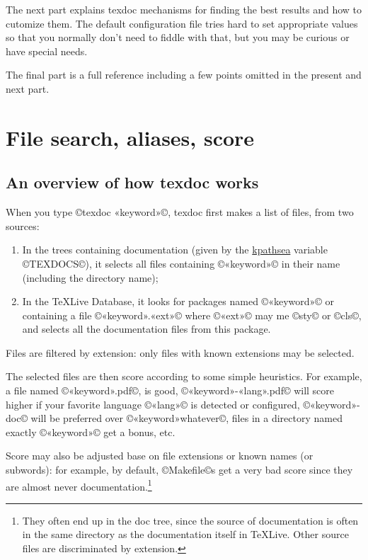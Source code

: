 \documentclass[a4paper, oneside]{scrartcl}
\newcommand\texlive{%
  \TeX\thinspace Live\xspace}
\begin{document}
The next part explains texdoc mechanisms for finding the best results and how
to cutomize them. The default configuration file tries hard to set appropriate
values so that you normally don't need to fiddle with that, but you may be
curious or have special needs.

The final part is a full reference including a few points omitted in the
present and next part.

\clearpage

\section{File search, aliases, score}

\subsection{An overview of how texdoc works}

When you type ©texdoc «keyword»©, texdoc first makes a list of files, from two
sources:
\begin{enumerate}
  \item In the trees containing documentation (given by the
    \href{http://www.tug.org/kpathsea/} {kpathsea} variable ©TEXDOCS©), it
    selects all files containing ©«keyword»© in their name (including the
    directory name);
  \item In the \texlive Database, it looks for packages named
    ©«keyword»© or containing a file ©«keyword».«ext»© where ©«ext»© may me
    ©sty© or ©cls©, and selects all the documentation files from this package.
\end{enumerate}
Files are filtered by extension: only files with known extensions may be
selected.

The selected files are then score according to some simple heuristics.  For
example, a file named ©«keyword».pdf©, is good, ©«keyword»-«lang».pdf© will
score higher if your favorite language ©«lang»© is detected or configured,
©«keyword»-doc© will be preferred over ©«keyword»whatever©, files in a
directory named exactly ©«keyword»© get a bonus, etc.

Score may also be adjusted base on file extensions or known names (or
subwords): for example, by default, ©Makefile©s get a very bad score since
they are almost never documentation.\footnote{They often end up in the doc
  tree, since the source of documentation is often in the same directory as
  the documentation itself in \texlive. Other source files are discriminated
  by extension.}
\end{document}
